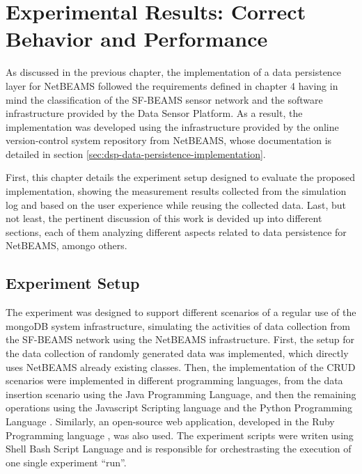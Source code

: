 

\chapter{Experimental Results: Correct Behavior and Performance}

As discussed in the previous chapter, the implementation of a data persistence
layer for NetBEAMS followed the requirements defined in chapter 4 having in
mind the classification of the SF-BEAMS sensor network and the software
infrastructure provided by the Data Sensor Platform. As a result, the
implementation was developed using the infrastructure provided by the online
version-control system repository from NetBEAMS, whose documentation is
detailed in section \ref{sec:dsp-data-persistence-implementation}.

First, this chapter details the experiment setup designed to evaluate the
proposed implementation, showing the measurement results collected from the
simulation log and based on the user experience while reusing the collected
data. Last, but not least, the pertinent discussion of this work is devided up
into different sections, each of them analyzing different aspects related to
data persistence for NetBEAMS, amongo others.

\section{Experiment Setup}

The experiment was designed to support different scenarios of a regular use of
the mongoDB system infrastructure, simulating the activities of data collection
from the SF-BEAMS network using the NetBEAMS infrastructure. First, the setup
for the data collection of randomly generated data was implemented, which
directly uses NetBEAMS already existing classes. Then, the implementation of
the CRUD scenarios were implemented in different programming languages, from
the data insertion scenario using the Java Programming Language, and then the
remaining operations using the Javascript Scripting language \cite{javascript}
and the Python Programming Language \cite{python}. Similarly, an open-source web
application, developed in the Ruby Programming language \cite{ruby}, was also
used. The experiment scripts were writen using Shell Bash Script Language
\cite{bashshell} and is responsible for orchestrasting the execution of one
single experiment ``run''.

